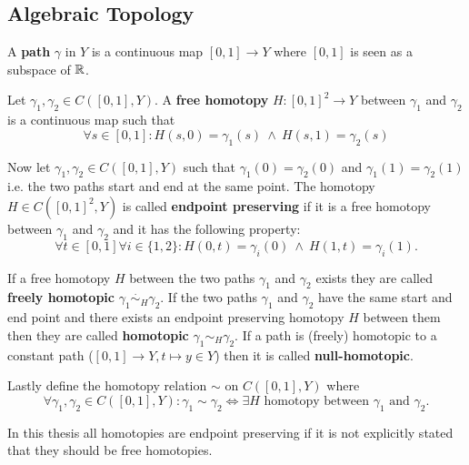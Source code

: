 \subsection{Algebraic Topology}

\begin{defin}
  A \textbf{path} $\gamma$ in $Y$ is a continuous map $[0,1] \to Y$ where $[0,1]$ is seen as a subspace of $\mathbb{R}$.
\end{defin}

\begin{defin}
  Let $\gamma_1, \gamma_2 \in C([0, 1], Y)$. A \textbf{free homotopy} $H\colon [0,1]^2 \to Y$ between $\gamma_1$ and $\gamma_2$ is a continuous map such that
  \begin{equation*}
    \forall s \in [0,1]\colon H(s, 0) = \gamma_1(s) \: \land \: H(s, 1) = \gamma_2(s)
  \end{equation*}

  Now let $\gamma_1, \gamma_2 \in C([0, 1], Y)$ such that $\gamma_1(0) = \gamma_2(0)$ and $\gamma_1(1) = \gamma_2(1)$ i.e. the two paths start and end at the same point.
  The homotopy $H \in C([0,1]^2, Y)$ is called \textbf{endpoint preserving} if it is a free homotopy between $\gamma_1$ and $\gamma_2$ and it has the following property:
  \begin{equation*}
    \forall t\in[0,1]\forall i\in \{1,2\}\colon H(0, t) = \gamma_i(0) \: \land \: H(1, t) = \gamma_i(1).
  \end{equation*}

  If a free homotopy $H$ between the two paths $\gamma_1$ and $\gamma_2$ exists they are called \textbf{freely homotopic} $\gamma_1 \overset{\cdot}{\sim}_H \gamma_2$.
  If the two paths $\gamma_1$ and $\gamma_2$ have the same start and end point and there exists an endpoint preserving homotopy $H$ between them then they are called 
  \textbf{homotopic} $\gamma_1 \sim_H \gamma_2$. If a path is (freely) homotopic to a constant path ($[0,1] \to Y, t \mapsto y \in Y$) then it is called \textbf{null-homotopic}.

  Lastly define the homotopy relation $\sim$ on $C([0,1], Y)$ where 
  \begin{equation*}
    \forall\gamma_1, \gamma_2 \in C([0,1], Y)\colon \gamma_1 \sim \gamma_2 \iff \exists H \text{ homotopy between } \gamma_1 \text{ and } \gamma_2.
  \end{equation*}
\end{defin}

In this thesis all homotopies are endpoint preserving if it is not explicitly stated that they should be free homotopies.


